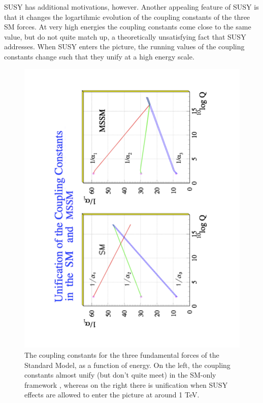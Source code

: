 SUSY has additional motivations, however.  Another appealing feature of SUSY is that it 
changes the logartihmic evolution of the coupling constants of the three SM forces.  At very high energies the 
coupling constants come close to the same value, but do not quite match up, 
a theoretically unsatisfying fact that SUSY addresses.  When SUSY enters the picture, the 
running values of the coupling constants change such that they unify at a high energy scale.

\begin{figure}
	\includegraphics[width=\textwidth]{Theory/figures/kazakov_coupling.pdf}
    \caption{The coupling constants for the three fundamental forces of the Standard Model, as a 
    function of energy.  On the left, the coupling constants almost unify 
    (but don't quite meet) in the SM-only framework
    , whereas on the right there is unification when SUSY effects are allowed to 
    enter the picture at around 1 TeV\cite{Kazakov}. }
	\label{fig:couplings}
\end{figure}


